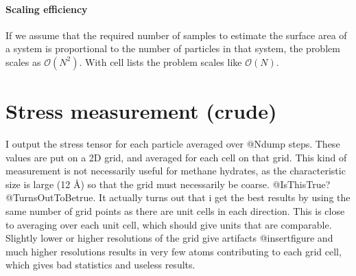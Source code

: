 \paragraph{Scaling efficiency}
If we assume that the required number of samples to estimate the surface area of a system is proportional to the number of particles in that system, the problem scales as $\mathcal{O}(N^2)$. With cell lists the problem scales like $\mathcal{O}(N)$.


\section{Stress measurement (crude)}
I output the stress tensor for each particle averaged over @Ndump steps. These values are put on a 2D grid, and averaged for each cell on that grid. This kind of measurement is not necessarily useful for methane hydrates, as the characteristic size is large (12 Å) so that the grid must necessarily be coarse. @IsThisTrue?@TurnsOutToBetrue. It actually turns out that i get the best results by using the same number of grid points as there are unit cells in each direction. This is close to averaging over each unit cell, which should give units that are comparable. Slightly lower or higher resolutions of the grid give artifacts @insertfigure and much higher resolutions results in very few atoms contributing to each grid cell, which gives bad statistics and useless results. 

